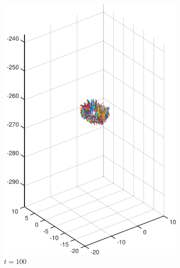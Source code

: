 \documentclass[a4paper,11pt]{kth-mag}
\begin{document}
\begin{figure}[!htbp]
\begin{subfigure}[h]{0.45\textwidth}
    \includegraphics[width=\textwidth]{img/sphere_00100.pdf}
    \caption{$t=100$}\label{fig:sphere_simulation_1b}
  \end{subfigure}
  \begin{subfigure}[h]{0.45\textwidth}
    \centering

\end{subfigure}
\end{figure}
\end{document}
